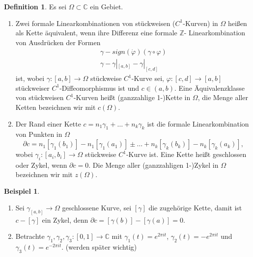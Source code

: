 \documentclass[11pt,titlepage]{article}
\theoremstyle{definition}
\newtheorem{definition}[theorem]{Definition}
\newtheorem{example}[theorem]{Beispiel}
\theoremstyle{remark}
\begin{document}
	\begin{definition} \label{def:Kette}
		Es sei $\Omega\subset\mathbb{C}$ ein Gebiet. 
		\begin{enumerate}
			\item \label{def:Kette1}
			Zwei formale Linearkombinationen von stückweisen ($C^1$-Kurven) in $\Omega$ 
			heißen als Kette äquivalent, wenn ihre Differenz eine formale $\mathbb{Z}$-
			Linearkombination von Ausdrücken der Formen 
			\begin{eqnarray*}
				\gamma -sign(\dot{\varphi})(\gamma \circ\varphi) \\
				\gamma -\gamma|_{[a,b]} -\gamma|_{[c,d]} 
			\end{eqnarray*}
			ist, wobei $\gamma:[a,b]\to\Omega$ stückweise $C^1$-Kurve sei, 
			$\varphi:[c,d]\to [a,b]$ stückweiser $C^1$-Diffeomorphismus ist und $c\in (a,b)$. 
			Eine Äquivalenzklasse von stückweisen $C^1$-Kurven heißt 
			(ganzzahlige 1-)Kette in $\Omega$, die Menge aller Ketten bezeichnen wir mit 
			$c(\Omega)$.
			
			\item Der Rand einer Kette $c=n_1 \gamma_1 +\ldots+n_k\gamma_k$ ist die formale 
			Linearkombination von Punkten in $\Omega$ 
			\[ \partial c=n_1 [\gamma_1(b_1)]-n_1[\gamma_1(a_1)] ±\ldots +n_k[\gamma_k(b_k)]-
			n_k[\gamma_k(a_k)], \]
			wobei $\gamma_i :[a_i,b_i]\to\Omega$ stückweise $C^1$-Kurve ist. 
			Eine Kette heißt geschlossen oder Zykel, wenn $\partial c=0$. Die Menge aller 
			(ganzzahligen 1-)Zykel in $\Omega$ bezeichnen wir mit $z(\Omega)$.
		\end{enumerate}
	\end{definition}
	
	\begin{example}
		\begin{enumerate}
			\item Sei $\gamma_[a,b]\to\Omega$ geschlossene Kurve, sei $[\gamma]$ die 
			zugehörige Kette, damit ist $c-[\gamma]$ ein Zykel, denn 
			$\partial c =[\gamma(b)]-[\gamma(a)]=0$.
			
			\item Betrachte $\gamma_1 ,\gamma_2 ,\gamma_3 :[0,1]\to\mathbb{C}$ mit 
			$\gamma_1(t)=e^{2\pi it}$, $\gamma_2(t)=-e^{2\pi it}$ und $\gamma_3(t)=e^{-2\pi it}$. 
			(werden später wichtig)
		\end{enumerate}
	\end{example}
	
\end{document}

